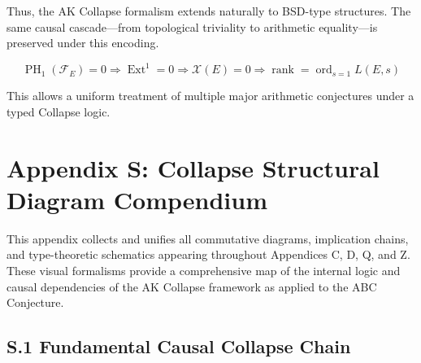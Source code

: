 \documentclass[11pt]{article}
\DeclareMathOperator{\Ext}{Ext}
\DeclareMathOperator{\PH}{PH}
\newcommand{\Sha}{\mathcal{X}}
\begin{document}
Thus, the AK Collapse formalism extends naturally to BSD-type structures.  
The same causal cascade—from topological triviality to arithmetic equality—is preserved under this encoding.

\[
\boxed{
\PH_1(\mathcal{F}_E) = 0 \Rightarrow \Ext^1 = 0 \Rightarrow \Sha(E) = 0 \Rightarrow \operatorname{rank} = \operatorname{ord}_{s=1} L(E,s)
}
\]

This allows a uniform treatment of multiple major arithmetic conjectures under a typed Collapse logic.



\section*{Appendix S: Collapse Structural Diagram Compendium}

This appendix collects and unifies all commutative diagrams, implication chains,  
and type-theoretic schematics appearing throughout Appendices C, D, Q, and Z.  
These visual formalisms provide a comprehensive map of the internal logic and  
causal dependencies of the AK Collapse framework as applied to the ABC Conjecture.

\subsection*{S.1 Fundamental Causal Collapse Chain}

\begin{center}
\end{center}
\end{document}
